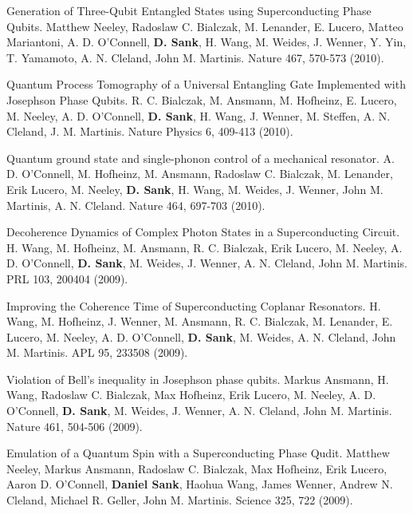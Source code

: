 \documentclass[margin=2cm,line]{res}
\begin{document}
\begin{resume}
\begin{list3}
\item Generation of Three-Qubit Entangled States using Superconducting Phase Qubits. Matthew Neeley, Radoslaw C. Bialczak, M. Lenander, E. Lucero, Matteo Mariantoni, A. D. O'Connell, \textbf{D. Sank}, H. Wang, M. Weides, J. Wenner, Y. Yin, T. Yamamoto, A. N. Cleland, John M. Martinis. Nature 467, 570-573 (2010). \\

\item Quantum Process Tomography of a Universal Entangling Gate Implemented with Josephson Phase Qubits. R. C. Bialczak, M. Ansmann, M. Hofheinz, E. Lucero, M. Neeley, A. D. O'Connell, \textbf{D. Sank}, H. Wang, J. Wenner, M. Steffen, A. N. Cleland, J. M. Martinis. Nature Physics 6, 409-413 (2010). \\

\item Quantum ground state and single-phonon control of a mechanical resonator. A. D. O'Connell, M. Hofheinz, M. Ansmann, Radoslaw C. Bialczak, M. Lenander, Erik Lucero, M. Neeley, \textbf{D. Sank}, H. Wang, M. Weides, J. Wenner, John M. Martinis, A. N. Cleland. Nature 464, 697-703 (2010). \\

\item Decoherence Dynamics of Complex Photon States in a Superconducting Circuit. H. Wang, M. Hofheinz, M. Ansmann, R. C. Bialczak, Erik Lucero, M. Neeley, A. D. O'Connell, \textbf{D. Sank}, M. Weides, J. Wenner, A. N. Cleland, John M. Martinis. PRL 103, 200404 (2009). \\

\item Improving the Coherence Time of Superconducting Coplanar Resonators. H. Wang, M. Hofheinz, J. Wenner, M. Ansmann, R. C. Bialczak, M. Lenander, E. Lucero, M. Neeley, A. D. O'Connell, \textbf{D. Sank}, M. Weides, A. N. Cleland, John M. Martinis. APL 95, 233508 (2009). \\

\item Violation of Bell's inequality in Josephson phase qubits. Markus Ansmann, H. Wang, Radoslaw C. Bialczak, Max Hofheinz, Erik Lucero, M. Neeley, A. D. O'Connell, \textbf{D. Sank}, M. Weides, J. Wenner, A. N. Cleland, John M. Martinis. Nature 461, 504-506 (2009).

\item Emulation of a Quantum Spin with a Superconducting Phase Qudit. Matthew Neeley, Markus Ansmann, Radoslaw C. Bialczak, Max Hofheinz, Erik Lucero, Aaron D. O'Connell, \textbf{Daniel Sank}, Haohua Wang, James Wenner, Andrew N. Cleland, Michael R. Geller, John M. Martinis. Science 325, 722 (2009). \\


\end{list3}
\end{resume}
\end{document}

